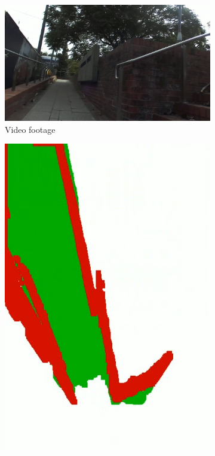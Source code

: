 \setlength{\abovecaptionskip}{4pt}
\begin{figure}[p]
    \centering
    \begin{subfigure}{.5\textwidth}
        \centering
        \includegraphics[width=\linewidth]{images/vfh_example_video.PNG}
        \caption{Video footage}
    \end{subfigure}
    \quad
    \begin{subfigure}{.2\textwidth}
        \centering
        \includegraphics[width=\linewidth,frame]{images/vfh_example_map.PNG}

\end{subfigure}
\end{figure}
